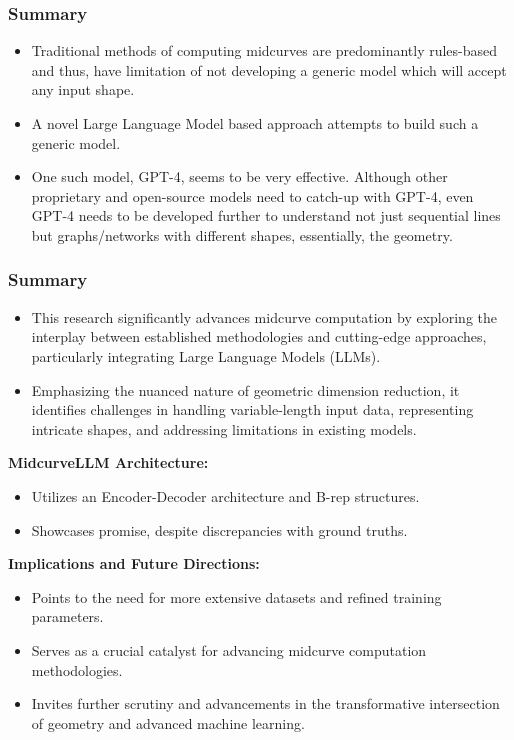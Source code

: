 \begin{frame}[fragile]\frametitle{Summary}
	\begin{itemize}
	\item Traditional methods of computing midcurves are predominantly rules-based and thus, have limitation of not developing a generic model which will accept any input shape. 	
	\item A novel Large Language Model based approach attempts to build such a generic model. 
	\item One such model, GPT-4, seems to be very effective. Although other proprietary and open-source models need to catch-up with GPT-4, even GPT-4 needs to be developed further to understand not just sequential lines but graphs/networks with different shapes, essentially, the geometry.  
	\end{itemize}	
\end{frame}


\begin{frame}[fragile]\frametitle{Summary}
    \begin{itemize}
        \item This research significantly advances midcurve computation by exploring the interplay between established methodologies and cutting-edge approaches, particularly integrating Large Language Models (LLMs).
        \item Emphasizing the nuanced nature of geometric dimension reduction, it identifies challenges in handling variable-length input data, representing intricate shapes, and addressing limitations in existing models.
    \end{itemize}
    

    \textbf{MidcurveLLM Architecture:}
    \begin{itemize}
        \item Utilizes an Encoder-Decoder architecture and B-rep structures.
        \item Showcases promise, despite discrepancies with ground truths.
    \end{itemize}
    
    
    \textbf{Implications and Future Directions:}
    \begin{itemize}
        \item Points to the need for more extensive datasets and refined training parameters.
        \item Serves as a crucial catalyst for advancing midcurve computation methodologies.
        \item Invites further scrutiny and advancements in the transformative intersection of geometry and advanced machine learning.
    \end{itemize}
\end{frame}
